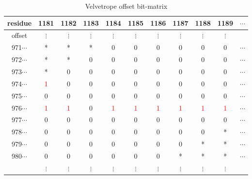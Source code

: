 \documentclass[phd,tocprelim]{cornell}
\begin{document}
\begin{table}[htp]
    \caption{Velvetrope offset bit-matrix}
    \label{VRtab2}
\begin{center}
{\small
\begin{tabular}{|ccccccccccc|}                                                                                                     
\hline                                                                                                                                      
\scriptsize{residue} & \small{1181} &  \small{1182} &  \small{1183} &  \small{1184} &  \small{1185} &  \small{1186} &  \small{1187} &  \small{1188} &  \small{1189} & \small{}$\cdots$ \\                                                                                             
\hline                                                                                                                                                                                                      
\scriptsize{offset} & $\vdots$ &  $\vdots$ &  $\vdots$ & $\vdots$ &  $\vdots$ &  $\vdots$ & $\vdots$ &  $\vdots$ &  $\vdots$ & \\                                                                                                                                                                          
\small{971}$\cdots$ & * & * & * & 0 & 0 & 0 & 0 & 0 & 0 & $\cdots$ \\                                                                                  
\small{972}$\cdots$ & * & * & 0 & 0 & 0 & 0 & 0 & 0 & 0 & $\cdots$ \\                                                                                  
\small{973}$\cdots$ & * & 0 & 0 & 0 & 0 & 0 & 0 & 0 & 0 & $\cdots$ \\                                                                                  
\small{974}$\cdots$ & \textcolor{red}{1} & 0 & 0 & 0 & 0 & 0 & 0 & 0 & 0 & $\cdots$ \\                                                                 
\small{975}$\cdots$ & 0 & 0 & 0 & 0 & 0 & 0 & 0 & 0 & 0 & $\cdots$ \\
\small{976}$\cdots$ & \textcolor{red}{1} & \textcolor{red}{1} & 0 & \textcolor{red}{1} & \textcolor{red}{1} & \textcolor{red}{1} & \textcolor{red}{1} & \textcolor{red}{1} & \textcolor{red}{1} &  $\cdots$ \\
\small{977}$\cdots$ & 0 & 0 & 0 & 0 & 0 & 0 & 0 & 0 & 0 & $\cdots$ \\
\small{978}$\cdots$ & 0 & 0 & 0 & 0 & 0 & 0 & 0 & 0 & * & $\cdots$ \\
\small{979}$\cdots$ & 0 & 0 & 0 & 0 & 0 & 0 & 0 & * & * & $\cdots$ \\
\small{980}$\cdots$ & 0 & 0 & 0 & 0 & 0 & 0 & * & * & * & $\cdots$ \\
 & $\vdots$ &  $\vdots$ &  $\vdots$ &  $\vdots$ & $\vdots$ &  $\vdots$ &  $\vdots$ &  $\vdots$&  $\vdots$ & \\
\hline
\end{tabular}
}
\end{center}
\end{table}
\end{document}
